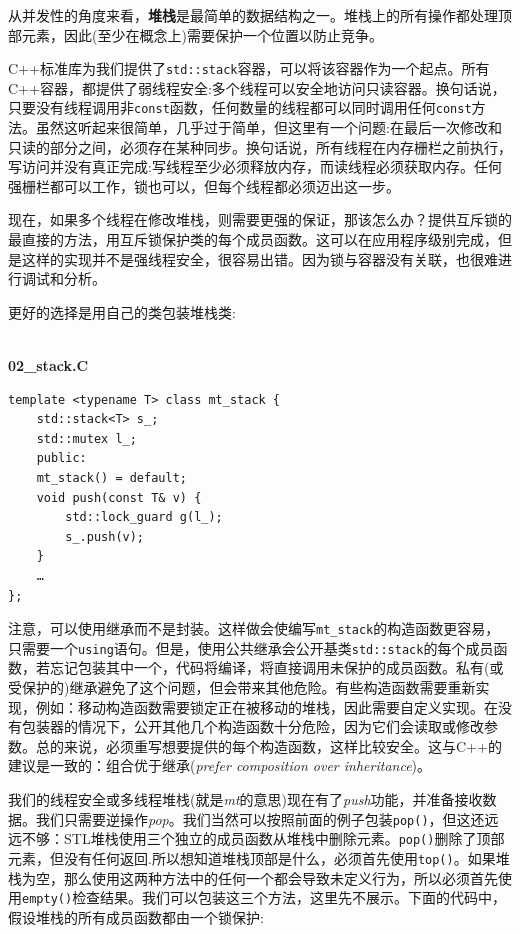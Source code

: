 
从并发性的角度来看，\textbf{堆栈}是最简单的数据结构之一。堆栈上的所有操作都处理顶部元素，因此(至少在概念上)需要保护一个位置以防止竞争。

C++标准库为我们提供了\texttt{std::stack}容器，可以将该容器作为一个起点。所有C++容器，都提供了弱线程安全:多个线程可以安全地访问只读容器。换句话说，只要没有线程调用非\texttt{const}函数，任何数量的线程都可以同时调用任何\texttt{const}方法。虽然这听起来很简单，几乎过于简单，但这里有一个问题:在最后一次修改和只读的部分之间，必须存在某种同步。换句话说，所有线程在内存栅栏之前执行，写访问并没有真正完成:写线程至少必须释放内存，而读线程必须获取内存。任何强栅栏都可以工作，锁也可以，但每个线程都必须迈出这一步。


现在，如果多个线程在修改堆栈，则需要更强的保证，那该怎么办？提供互斥锁的最直接的方法，用互斥锁保护类的每个成员函数。这可以在应用程序级别完成，但是这样的实现并不是强线程安全，很容易出错。因为锁与容器没有关联，也很难进行调试和分析。

更好的选择是用自己的类包装堆栈类:

\hspace*{\fill} \\ %
\noindent
\textbf{02\_stack.C}
\begin{lstlisting}[style=styleCXX]
template <typename T> class mt_stack {
	std::stack<T> s_;
	std::mutex l_;
	public:
	mt_stack() = default;
	void push(const T& v) {
		std::lock_guard g(l_);
		s_.push(v);
	}
	…
};
\end{lstlisting}

注意，可以使用继承而不是封装。这样做会使编写\texttt{mt\_stack}的构造函数更容易，只需要一个\texttt{using}语句。但是，使用公共继承会公开基类\texttt{std::stack}的每个成员函数，若忘记包装其中一个，代码将编译，将直接调用未保护的成员函数。私有(或受保护的)继承避免了这个问题，但会带来其他危险。有些构造函数需要重新实现，例如：移动构造函数需要锁定正在被移动的堆栈，因此需要自定义实现。在没有包装器的情况下，公开其他几个构造函数十分危险，因为它们会读取或修改参数。总的来说，必须重写想要提供的每个构造函数，这样比较安全。这与C++的建议是一致的：组合优于继承(\textit{prefer composition over inheritance})。

我们的线程安全或多线程堆栈(就是\textit{mt}的意思)现在有了\textit{push}功能，并准备接收数据。我们只需要逆操作\textit{pop}。我们当然可以按照前面的例子包装\texttt{pop()}，但这还远远不够：STL堆栈使用三个独立的成员函数从堆栈中删除元素。\texttt{pop()}删除了顶部元素，但没有任何返回.所以想知道堆栈顶部是什么，必须首先使用\texttt{top()}。如果堆栈为空，那么使用这两种方法中的任何一个都会导致未定义行为，所以必须首先使用\texttt{empty()}检查结果。我们可以包装这三个方法，这里先不展示。下面的代码中，假设堆栈的所有成员函数都由一个锁保护:


